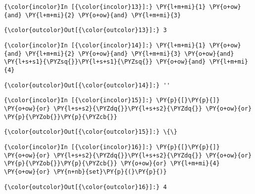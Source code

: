     \begin{Verbatim}[commandchars=\\\{\}]
{\color{incolor}In [{\color{incolor}13}]:} \PY{l+m+mi}{1} \PY{o+ow}{and} \PY{l+m+mi}{2} \PY{o+ow}{and} \PY{l+m+mi}{3}
\end{Verbatim}


\begin{Verbatim}[commandchars=\\\{\}]
{\color{outcolor}Out[{\color{outcolor}13}]:} 3
\end{Verbatim}
            
    \begin{Verbatim}[commandchars=\\\{\}]
{\color{incolor}In [{\color{incolor}14}]:} \PY{l+m+mi}{1} \PY{o+ow}{and} \PY{l+m+mi}{2} \PY{o+ow}{and} \PY{l+m+mi}{3} \PY{o+ow}{and} \PY{l+s+s1}{\PYZsq{}}\PY{l+s+s1}{\PYZsq{}} \PY{o+ow}{and} \PY{l+m+mi}{4}
\end{Verbatim}


\begin{Verbatim}[commandchars=\\\{\}]
{\color{outcolor}Out[{\color{outcolor}14}]:} ''
\end{Verbatim}
            
    \begin{Verbatim}[commandchars=\\\{\}]
{\color{incolor}In [{\color{incolor}15}]:} \PY{p}{[}\PY{p}{]} \PY{o+ow}{or} \PY{l+s+s2}{\PYZdq{}}\PY{l+s+s2}{\PYZdq{}} \PY{o+ow}{or} \PY{p}{\PYZob{}}\PY{p}{\PYZcb{}}
\end{Verbatim}


\begin{Verbatim}[commandchars=\\\{\}]
{\color{outcolor}Out[{\color{outcolor}15}]:} \{\}
\end{Verbatim}
            
    \begin{Verbatim}[commandchars=\\\{\}]
{\color{incolor}In [{\color{incolor}16}]:} \PY{p}{[}\PY{p}{]} \PY{o+ow}{or} \PY{l+s+s2}{\PYZdq{}}\PY{l+s+s2}{\PYZdq{}} \PY{o+ow}{or} \PY{p}{\PYZob{}}\PY{p}{\PYZcb{}} \PY{o+ow}{or} \PY{l+m+mi}{4} \PY{o+ow}{or} \PY{n+nb}{set}\PY{p}{(}\PY{p}{)}
\end{Verbatim}


\begin{Verbatim}[commandchars=\\\{\}]
{\color{outcolor}Out[{\color{outcolor}16}]:} 4
\end{Verbatim}
            
